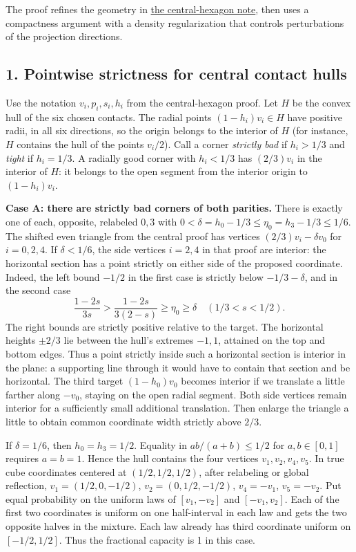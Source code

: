 \documentclass[
  10pt,
]{article}
\begin{document}
The proof refines the geometry in \href{central-hexagon.md}{the
central-hexagon note}, then uses a compactness argument with a density
regularization that controls perturbations of the projection directions.

\subsection{1. Pointwise strictness for central contact
hulls}\label{pointwise-strictness-for-central-contact-hulls}

Use the notation \(v_i,p_i,s_i,h_i\) from the central-hexagon proof. Let
\(H\) be the convex hull of the six chosen contacts. The radial points
\((1-h_i)v_i\in H\) have positive radii, in all six directions, so the
origin belongs to the interior of \(H\) (for instance, \(H\) contains
the hull of the points \(v_i/2\)). Call a corner \emph{strictly bad} if
\(h_i>1/3\) and \emph{tight} if \(h_i=1/3\). A radially good corner with
\(h_i<1/3\) has \((2/3)v_i\) in the interior of \(H\): it belongs to the
open segment from the interior origin to \((1-h_i)v_i\).

\textbf{Case A: there are strictly bad corners of both parities.} There
is exactly one of each, opposite, relabeled \(0,3\) with
\(0<\delta=h_0-1/3\le\eta_0=h_3-1/3\le1/6\). The shifted even triangle
from the central proof has vertices \((2/3)v_i-\delta v_0\) for
\(i=0,2,4\). If \(\delta<1/6\), the side vertices \(i=2,4\) in that
proof are interior: the horizontal section has a point strictly on
either side of the proposed coordinate. Indeed, the left bound \(-1/2\)
in the first case is strictly below \(-1/3-\delta\), and in the second
case \[
\frac{1-2s}{3s}>\frac{1-2s}{3(2-s)}\ge\eta_0\ge\delta
\quad (1/3<s<1/2).
\] The right bounds are strictly positive relative to the target. The
horizontal heights \(\pm2/3\) lie between the hull's extremes \(-1,1\),
attained on the top and bottom edges. Thus a point strictly inside such
a horizontal section is interior in the plane: a supporting line through
it would have to contain that section and be horizontal. The third
target \((1-h_0)v_0\) becomes interior if we translate a little farther
along \(-v_0\), staying on the open radial segment. Both side vertices
remain interior for a sufficiently small additional translation. Then
enlarge the triangle a little to obtain common coordinate width strictly
above \(2/3\).

If \(\delta=1/6\), then \(h_0=h_3=1/2\). Equality in \(ab/(a+b)\le1/2\)
for \(a,b\in[0,1]\) requires \(a=b=1\). Hence the hull contains the four
vertices \(v_1,v_2,v_4,v_5\). In true cube coordinates centered at
\((1/2,1/2,1/2)\), after relabeling or global reflection,
\(v_1=(1/2,0,-1/2)\), \(v_2=(0,1/2,-1/2)\), \(v_4=-v_1\), \(v_5=-v_2\).
Put equal probability on the uniform laws of \([v_1,-v_2]\) and
\([-v_1,v_2]\). Each of the first two coordinates is uniform on one
half-interval in each law and gets the two opposite halves in the
mixture. Each law already has third coordinate uniform on
\([-1/2,1/2]\). Thus the fractional capacity is 1 in this case.
\end{document}
